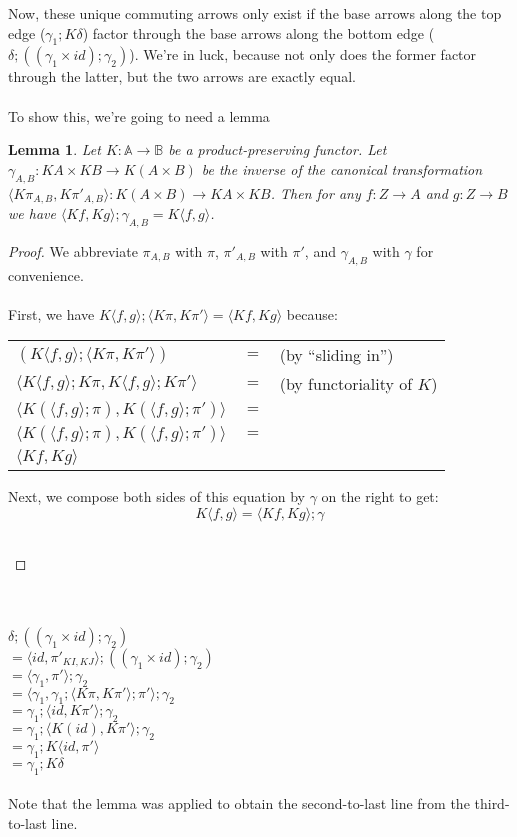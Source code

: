 \documentclass{article}
\newtheorem{lemma}{Lemma}
\begin{document}
Now, these unique commuting arrows only exist if the base arrows along the top edge ($\gamma_1;K\delta$) factor through the base arrows along the bottom edge ($\delta;((\gamma_1 \times id);\gamma_2)$). We're in luck, because not only does the former 
factor through the latter, but the two arrows are exactly equal.\\~\\
To show this, we're going to need a lemma
\begin{lemma}
Let $K : \mathbb A \to \mathbb B$ be a product-preserving functor. Let $\gamma_{A,B} : KA \times KB \to K(A \times B)$ be 
the inverse of the canonical transformation $\langle K\pi_{A,B}, K\pi'_{A,B} \rangle : K(A \times B) \to KA \times KB$.
Then for any $f : Z \to A$ and $g : Z \to B$ we have $\langle Kf, Kg \rangle;\gamma_{A,B} = K\langle f, g \rangle$.
\end{lemma}

\begin{proof}
We abbreviate $\pi_{A,B}$ with $\pi$, $\pi'_{A,B}$ with $\pi'$, and $\gamma_{A,B}$ with $\gamma$ for convenience.\\~\\
First, we have $K\langle f,g \rangle;\langle K\pi, K\pi' \rangle = \langle Kf, Kg \rangle$ because:
\begin{center}
\begin{tabular}{lll}
$(K\langle f,g \rangle;\langle K\pi, K\pi' \rangle)$ & $=$ & (by ``sliding in'') \\
$\langle K \langle f,g \rangle;K\pi, K\langle f,g \rangle;K\pi' \rangle$ & $=$ & (by functoriality of $K$) \\
$\langle K(\langle f,g \rangle;\pi), K(\langle f,g \rangle;\pi') \rangle$ & $=$ & \\
$\langle K(\langle f,g \rangle;\pi), K(\langle f,g \rangle;\pi') \rangle$ & $=$ & \\
$\langle Kf, Kg \rangle$ & &
\end{tabular}
\end{center}
Next, we compose both sides of this equation by $\gamma$ on the right to get:
$$K\langle f,g \rangle = \langle Kf, Kg \rangle;\gamma$$
\begin{tabular}{ll}
\end{tabular}
\end{proof}~\\~\\
$\delta;((\gamma_1 \times id);\gamma_2)$\\
$= \langle id, \pi'_{KI,KJ} \rangle;((\gamma_1 \times id);\gamma_2)$\\
$= \langle \gamma_1, \pi' \rangle;\gamma_2$\\
$= \langle \gamma_1, \gamma_1;\langle K \pi, K \pi' \rangle;\pi' \rangle;\gamma_2$\\
$= \gamma_1;\langle id, K \pi' \rangle;\gamma_2$\\
$= \gamma_1;\langle K(id), K\pi' \rangle;\gamma_2$\\
$= \gamma_1;K\langle id, \pi' \rangle$\\
$= \gamma_1;K\delta$\\~\\
Note that the lemma was applied to obtain the second-to-last line from the third-to-last line.
\end{document}
